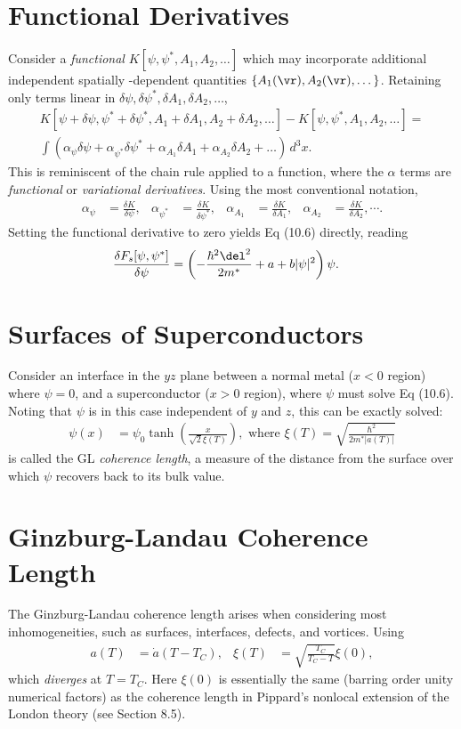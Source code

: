 \documentclass[a4paper, 11pt, normalem]{report}
\begin{document}
\section{Functional Derivatives}
Consider a \emph{functional} $K[\psi,\psi^*,A_1,A_2,\dots]$ which may incorporate additional independent spatially -dependent quantities $\{A_1(\vr),A_2(\vr),\dots\}$.
Retaining only terms linear in $\delta\psi,\delta\psi^*,\delta A_1,\delta A_2,\dots$,
\begin{multline}
    K[\psi+\delta\psi,\psi^*+\delta\psi^*,A_1+\delta A_1,A_2+\delta A_2,\dots] - K[\psi,\psi^*,A_1,A_2,\dots] = \\ \int \left(\alpha_\psi\delta\psi + \alpha_{\psi^*}\delta\psi^* + \alpha_{A_1}\delta A_1 + \alpha_{A_2}\delta A_2 + \dots\right)\,d^3x.
\end{multline}
This is reminiscent of the chain rule applied to a function, where the $\alpha$ terms are \emph{functional} or \emph{variational derivatives}.
Using the most conventional notation,
\begin{align}
    \alpha_\psi &= \frac{\delta K}{\delta\psi}, & \alpha_{\psi^*} &= \frac{\delta K}{\delta\psi^*}, & \alpha_{A_1} &= \frac{\delta K}{\delta A_1}, & \alpha_{A_2} &= \frac{\delta K}{\delta A_2},\cdots.
\end{align}
Setting the functional derivative to zero yields Eq (10.6) directly, reading
\begin{align}
    \frac{\delta F_s[\psi,\psi^*]}{\delta\psi} &= \left(-\frac{\hbar^2\del^2}{2m^*}+a+b|\psi|^2\right)\psi.
\end{align}

\section{Surfaces of Superconductors}
Consider an interface in the $yz$ plane between a normal metal ($x<0$ region) where $\psi=0$, and a superconductor ($x>0$ region), where $\psi$ must solve Eq (10.6).
Noting that $\psi$ is in this case independent of $y$ and $z$, this can be exactly solved:
\begin{align}
    \psi(x) &= \psi_0\tanh\left(\frac{x}{\sqrt{2}\xi(T)}\right), \text{ where } \xi(T) = \sqrt{\frac{\hbar^2}{2m^*|a(T)|}}
\end{align}
is called the GL \emph{coherence length}, a measure of the distance from the surface over which $\psi$ recovers back to its bulk value.

\section{Ginzburg-Landau Coherence Length}
The Ginzburg-Landau coherence length arises when considering most inhomogeneities, such as surfaces, interfaces, defects, and vortices.
Using
\begin{align}
    a(T) &= \dot{a}(T-T_C), & \xi(T) &= \sqrt{\frac{T_C}{T_C-T}}\xi(0),
\end{align}
which \emph{diverges} at $T=T_C$.
Here $\xi(0)$ is essentially the same (barring order unity numerical factors) as the coherence length in Pippard's nonlocal extension of the London theory (see Section 8.5).
\end{document}
